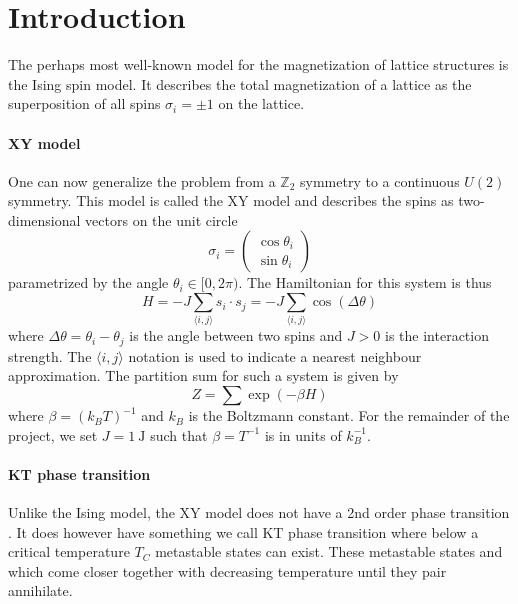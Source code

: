 \section{Introduction}
The perhaps most well-known model for the magnetization of lattice structures is the Ising spin model. It describes the total magnetization of a lattice as the superposition of all spins $\sigma_i = \pm 1$ on the lattice.

\paragraph{XY model}
One can now generalize the problem from a $\mathbb{Z}_2$ symmetry to a continuous $U(2)$ symmetry. This model is called the XY model and describes the spins as two-dimensional vectors on the unit circle
\begin{equation}\label{eq:hamiltonian}
	\sigma_i = \begin{pmatrix}
		\cos{\theta_i} \\ \sin{\theta_i}
	\end{pmatrix}
\end{equation}
parametrized by the angle $\theta_i \in [0,2\pi)$. The Hamiltonian for this system is thus
\begin{equation}\label{eq:partition}
	H = -J \sum_{\langle i,j \rangle}{s_i \cdot s_j} = -J \sum_{\langle i,j \rangle}{\cos{(\Delta \theta)}}
\end{equation}
\citet[p. 1190, eq. (42)]{kt} where $\Delta \theta = \theta_i - \theta_j$ is the angle between two spins and $J > 0$ is the interaction strength. The $\langle i,j \rangle$ notation is used to indicate a nearest neighbour approximation. The partition sum for such a system is given by
\begin{equation}
	Z = \sum{\exp{(-\beta H)}}
\end{equation}
where $\beta = (k_B T)^{-1}$ and $k_B$ is the Boltzmann constant.  For the remainder of the project, we set $J = \SI{1}{\joule}$ such that $\beta = T^{-1}$ is in units of $k_B^{-1}$.

\paragraph{KT phase transition}
Unlike the Ising model, the XY model does not have a 2nd order phase transition . It does however have something we call KT phase transition where below a critical temperature $T_C$ metastable states can exist. These metastable states  and which come closer together with decreasing temperature until they pair annihilate.